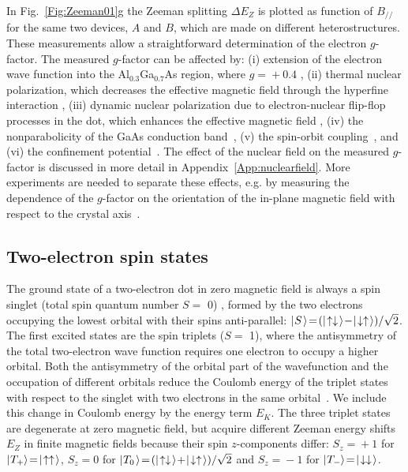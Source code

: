 \documentclass[12pt,aps,nofootinbib]{revtex4-1}
\begin{document}
In Fig.~\ref{Fig:Zeeman01}g the Zeeman splitting $\Delta E_Z$ is
plotted as function of $B_{//}$  for the same two devices, $A$ and
$B$, which are made on different heterostructures. These
measurements allow a straightforward determination of the electron
$g$-factor. The measured $g$-factor can be affected by: (i)
extension of the electron wave function into the
Al$_{0.3}$Ga$_{0.7}$As region, where $g\!=\!+0.4$
\cite{Snelling,salis01}, (ii) thermal nuclear polarization,
which decreases the effective magnetic field through the hyperfine
interaction \cite{BookOptical}, (iii) dynamic nuclear polarization
due to electron-nuclear flip-flop processes in the dot, which
enhances the effective magnetic field \cite{BookOptical}, (iv) the
nonparabolicity of the GaAs conduction band~\cite{Snelling}, (v)
the spin-orbit coupling~\cite{falko05}, and (vi) the confinement
potential~\cite{ WeisbuchPRB77,BjorkPRB05}. The effect of the
nuclear field on the measured $g$-factor is discussed in more
detail in Appendix~\ref{App:nuclearfield}. More experiments are
needed to separate these effects, e.g. by measuring the dependence
of the $g$-factor on the orientation of the in-plane magnetic
field with respect to the crystal axis~\cite{falko05}.


\subsection{Two-electron spin states}

The ground state of a two-electron dot in zero magnetic field is
always a spin singlet (total spin quantum number $S\!=\!$ 0)
\cite{ashcroft}, formed by the two electrons occupying the lowest
orbital with their spins anti-parallel:
$\ket{\:S}\!=\!(\ket{\ua\da}\!-\!\ket{\da\ua})/\sqrt{2}$. The
first excited states are the spin triplets ($S\!=\!$ 1), where the
antisymmetry of the total two-electron wave function requires one
electron to occupy a higher orbital. Both the antisymmetry of the
orbital part of the wavefunction and the occupation of different
orbitals reduce the Coulomb energy of the triplet states with
respect to the singlet with two electrons in the same
orbital~\cite{kouwenhoven01}. We include this change in Coulomb energy
by the energy term $E_K$. The three triplet states are
degenerate at zero magnetic field, but acquire different Zeeman
energy shifts $E_{Z}$ in finite magnetic fields because their spin
$z$-components differ: $S_z\!=\!+1$ for
$\mbox{$|\!\:T_{+\!}\;\!\rangle$}\!=\!\mbox{$|\!\uparrow\uparrow\;\!\rangle$}$, $S_z\!=\!0$ for
$\ket{\:T_{0}}\!=\!(\ket{\ua\da}\!+\!\ket{\da\ua})/\sqrt{2}$ and
$S_z\!=\!-1$ for $\mbox{$|\!\:T_{-\!}\;\!\rangle$}\!=\!\mbox{$|\!\downarrow\downarrow\;\!\rangle$}$.
\end{document}

